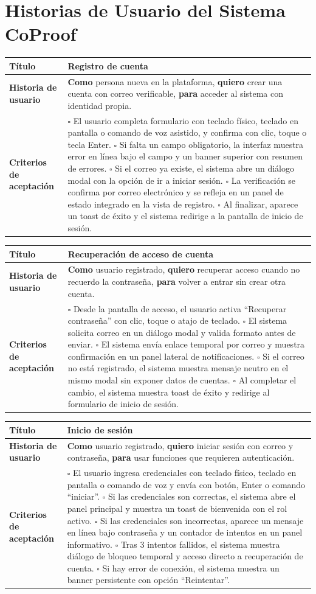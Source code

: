 \documentclass{article}
\newcommand{\story}[3]{
\begin{table}[H]
    \centering
    \begin{tabularx}{\textwidth}{| >{\raggedright\arraybackslash\bfseries\columncolor{leftheaderbg}}p{2.5cm} | >{\raggedright\arraybackslash\columncolor{contentbg}}X |}
        \hline
        Título & #1 \\
        \hline
        Historia de usuario & #2 \\
        \hline
        Criterios de aceptación & #3 \\
        \hline
    \end{tabularx}
\end{table}
}
\begin{document}
\section*{Historias de Usuario del Sistema CoProof}

\story
{Registro de cuenta}
{\textbf{Como} persona nueva en la plataforma, \textbf{quiero} crear una cuenta con correo verificable, \textbf{para} acceder al sistema con identidad propia.}
{$\square$ El usuario completa formulario con teclado físico, teclado en pantalla o comando de voz asistido, y confirma con clic, toque o tecla Enter. \newline
$\square$ Si falta un campo obligatorio, la interfaz muestra error en línea bajo el campo y un banner superior con resumen de errores. \newline
$\square$ Si el correo ya existe, el sistema abre un diálogo modal con la opción de ir a iniciar sesión. \newline
$\square$ La verificación se confirma por correo electrónico y se refleja en un panel de estado integrado en la vista de registro. \newline
$\square$ Al finalizar, aparece un toast de éxito y el sistema redirige a la pantalla de inicio de sesión.}

\story
{Recuperación de acceso de cuenta}
{\textbf{Como} usuario registrado, \textbf{quiero} recuperar acceso cuando no recuerdo la contraseña, \textbf{para} volver a entrar sin crear otra cuenta.}
{$\square$ Desde la pantalla de acceso, el usuario activa ``Recuperar contraseña'' con clic, toque o atajo de teclado. \newline
$\square$ El sistema solicita correo en un diálogo modal y valida formato antes de enviar. \newline
$\square$ El sistema envía enlace temporal por correo y muestra confirmación en un panel lateral de notificaciones. \newline
$\square$ Si el correo no está registrado, el sistema muestra mensaje neutro en el mismo modal sin exponer datos de cuentas. \newline
$\square$ Al completar el cambio, el sistema muestra toast de éxito y redirige al formulario de inicio de sesión.}

\story
{Inicio de sesión}
{\textbf{Como} usuario registrado, \textbf{quiero} iniciar sesión con correo y contraseña, \textbf{para} usar funciones que requieren autenticación.}
{$\square$ El usuario ingresa credenciales con teclado físico, teclado en pantalla o comando de voz y envía con botón, Enter o comando ``iniciar''. \newline
$\square$ Si las credenciales son correctas, el sistema abre el panel principal y muestra un toast de bienvenida con el rol activo. \newline
$\square$ Si las credenciales son incorrectas, aparece un mensaje en línea bajo contraseña y un contador de intentos en un panel informativo. \newline
$\square$ Tras 3 intentos fallidos, el sistema muestra diálogo de bloqueo temporal y acceso directo a recuperación de cuenta. \newline
$\square$ Si hay error de conexión, el sistema muestra un banner persistente con opción ``Reintentar''.}
\end{document}
